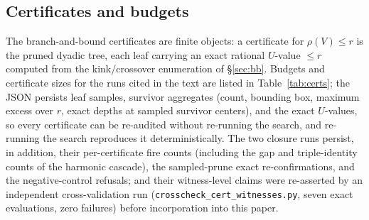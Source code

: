 \subsection{Certificates and budgets}

The branch-and-bound certificates are finite objects: a certificate for
$\rho(V)\le r$ is the pruned dyadic tree, each leaf carrying an exact
rational $U$-value $\le r$ computed from the kink/crossover enumeration
of \S\ref{sec:bb}. Budgets and certificate sizes for the runs cited in
the text are listed in Table~\ref{tab:certs}; the JSON persists leaf
samples, survivor aggregates (count, bounding box, maximum excess over
$r$, exact depths at sampled survivor centers), and the exact
$U$-values, so every certificate can be re-audited without re-running
the search, and re-running the search reproduces it deterministically.
The two closure runs persist, in addition, their per-certificate fire
counts (including the gap and triple-identity counts of the harmonic
cascade), the sampled-prune exact re-confirmations, and the
negative-control refusals; and their witness-level claims were
re-asserted by an independent cross-validation run
(\texttt{crosscheck\_cert\_witnesses.py}, seven exact evaluations,
zero failures) before incorporation into this paper.

